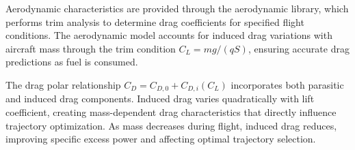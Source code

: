 

Aerodynamic characteristics are provided through the aerodynamic library, which performs trim analysis to determine drag coefficients for specified flight conditions. The aerodynamic model accounts for induced drag variations with aircraft mass through the trim condition $C_L = mg/(qS)$, ensuring accurate drag predictions as fuel is consumed.

The drag polar relationship $C_D = C_{D,0} + C_{D,i}(C_L)$ incorporates both parasitic and induced drag components. Induced drag varies quadratically with lift coefficient, creating mass-dependent drag characteristics that directly influence trajectory optimization. As mass decreases during flight, induced drag reduces, improving specific excess power and affecting optimal trajectory selection.
